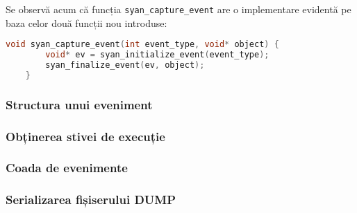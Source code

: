 Se observă acum că funcția \lstinline{syan_capture_event} are o
implementare evidentă pe baza celor două funcții nou introduse:
\begin{lstlisting}[language=C]
    void syan_capture_event(int event_type, void* object) {
        void* ev = syan_initialize_event(event_type);
        syan_finalize_event(ev, object);
    }
\end{lstlisting}

\subsubsection{Structura unui eveniment}

\subsubsection{Obținerea stivei de execuție}

\subsubsection{Coada de evenimente}

\subsubsection{Serializarea fișiserului DUMP}
